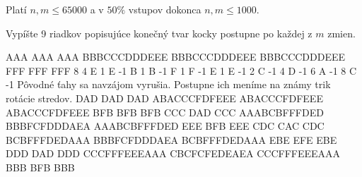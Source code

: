 \smallskip

Platí $n,m \leq 65000$
a v $50\%$ vstupov dokonca
$n,m \leq 1000$.


Vypíšte 9 riadkov popisujúce konečný tvar kocky
postupne po každej z $m$ zmien.


\sampleIN
AAA
AAA
AAA
BBBCCCDDDEEE
BBBCCCDDDEEE
BBBCCCDDDEEE
FFF
FFF
FFF
8 4
E 1
E -1
B 1
B -1
F 1
F -1
E 1
E -1
2 C -1
4 D -1
6 A -1
8 C -1
\sampleCOMMENT
Pôvodné ťahy sa navzájom vyrušia.
Postupne ich meníme na známy trik
rotácie stredov.
\sampleOUT
DAD
DAD
DAD
ABACCCFDFEEE
ABACCCFDFEEE
ABACCCFDFEEE
BFB
BFB
BFB
CCC
DAD
CCC
AAABCBFFFDED
BBBFCFDDDAEA
AAABCBFFFDED
EEE
BFB
EEE
CDC
CAC
CDC
BCBFFFDEDAAA
BBBFCFDDDAEA
BCBFFFDEDAAA
EBE
EFE
EBE
DDD
DAD
DDD
CCCFFFEEEAAA
CBCFCFEDEAEA
CCCFFFEEEAAA
BBB
BFB
BBB
\sampleEND


